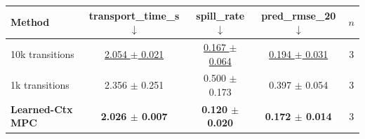\begin{tabular}{lcccc}
\toprule
Method & transport\_time\_s $\downarrow$ & spill\_rate $\downarrow$ & pred\_rmse\_20 $\downarrow$ & $n$ \\
\midrule
10k transitions & \underline{2.054 $\pm$ 0.021} & \underline{0.167 $\pm$ 0.064} & \underline{0.194 $\pm$ 0.031} & 3 \\
1k transitions & 2.356 $\pm$ 0.251 & 0.500 $\pm$ 0.173 & 0.397 $\pm$ 0.054 & 3 \\
\textbf{Learned-Ctx MPC} & \textbf{2.026 $\pm$ 0.007} & \textbf{0.120 $\pm$ 0.020} & \textbf{0.172 $\pm$ 0.014} & 3 \\
\bottomrule
\end{tabular}
